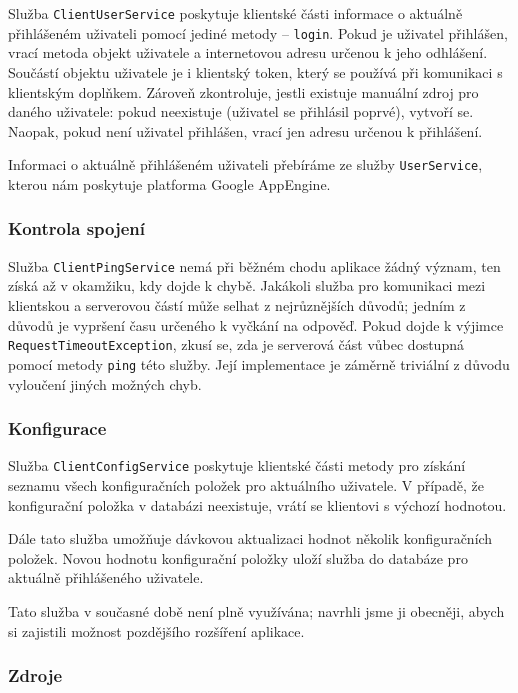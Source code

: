 Služba \verb|ClientUserService| poskytuje klientské části informace o aktuálně přihlášeném uživateli pomocí jediné metody -- \verb|login|.
Pokud je uživatel přihlášen, vrací metoda objekt uživatele a internetovou adresu určenou k jeho odhlášení.
Součástí objektu uživatele je i klientský token, který se používá při komunikaci s klientským doplňkem. %
Zároveň zkontroluje, jestli existuje manuální zdroj pro daného uživatele: pokud neexistuje (uživatel se přihlásil poprvé), vytvoří se.
Naopak, pokud není uživatel přihlášen, vrací jen adresu určenou k přihlášení.

Informaci o aktuálně přihlášeném uživateli přebíráme ze služby \verb|UserService|, kterou nám poskytuje platforma Google AppEngine.

\subsubsection{Kontrola spojení}

Služba \verb|ClientPingService| nemá při běžném chodu aplikace žádný význam, ten získá až v okamžiku, kdy dojde k chybě.
Jakákoli služba pro komunikaci mezi klientskou a serverovou částí může selhat z nejrůznějších důvodů; jedním z důvodů je vypršení času určeného k vyčkání na odpověď.
Pokud dojde k výjimce \verb|RequestTimeoutException|, zkusí se, zda je serverová část vůbec dostupná pomocí metody \verb|ping| této služby.
Její implementace je záměrně triviální z důvodu vyloučení jiných možných chyb.

\subsubsection{Konfigurace}

Služba \verb|ClientConfigService| poskytuje klientské části metody pro získání seznamu všech konfiguračních položek pro aktuálního uživatele.
V případě, že konfigurační položka v databázi neexistuje, vrátí se klientovi s výchozí hodnotou.

Dále tato služba umožňuje dávkovou aktualizaci hodnot několik konfiguračních položek.
Novou hodnotu konfigurační položky uloží služba do databáze pro aktuálně přihlášeného uživatele.

Tato služba v současné době není plně využívána; navrhli jsme ji obecněji, abych si zajistili možnost pozdějšího rozšíření aplikace.

\subsubsection{Zdroje}

